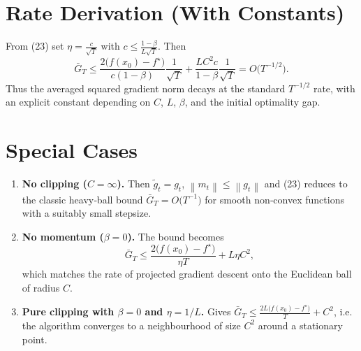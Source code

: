 \documentclass{article}
\newcommand{\norm}[1]{\left\lVert#1\right\rVert}
\begin{document}
\section*{Rate Derivation (With Constants)}
From (23) set $\eta = \frac{c}{\sqrt{T}}$ with $c\le \frac{1-\beta}{L\sqrt{T}}$.
Then
\[
\bar G_{T}
\le \frac{2\bigl(f(x_{0})-f^{\star}\bigr)}{c(1-\beta)}\frac{1}{\sqrt{T}}
   +\frac{L C^{2}c}{1-\beta}\frac{1}{\sqrt{T}}
   = O\!\bigl(T^{-1/2}\bigr).
\]
Thus the averaged squared gradient norm decays at the
standard $T^{-1/2}$ rate, with an explicit constant depending on $C$, $L$,
$\beta$, and the initial optimality gap.

\section*{Special Cases}
\begin{enumerate}[label=\arabic*.]
\item \textbf{No clipping ($C=\infty$).}
    Then $\tilde g_{t}=g_{t}$, $\norm{m_{t}}\le \norm{g_{t}}$ and (23) reduces to
    the classic heavy‑ball bound $\bar G_{T}=O\!\bigl(T^{-1}\bigr)$ for smooth
    non‑convex functions with a suitably small stepsize.
\item \textbf{No momentum ($\beta=0$).}
    The bound becomes
    \[
    \bar G_{T}\le \frac{2\bigl(f(x_{0})-f^{\star}\bigr)}{\eta T}
               +L\eta C^{2},
    \]
    which matches the rate of projected gradient descent onto the Euclidean
    ball of radius $C$.
\item \textbf{Pure clipping with $\beta=0$ and $\eta=1/L$.}
    Gives $\bar G_{T}\le \frac{2L\bigl(f(x_{0})-f^{\star}\bigr)}{T}+C^{2}$,
    i.e. the algorithm converges to a neighbourhood of size $C^{2}$ around a
    stationary point.
\end{enumerate}
\end{document}
